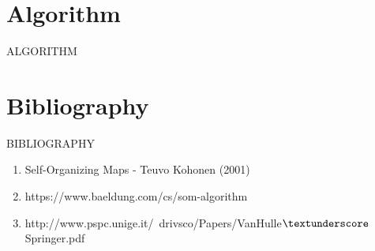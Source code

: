 \documentclass{beamer}
\begin{document}
\section{Algorithm}

	\begin{frame}
	
		\begin{center}
			
			\Huge ALGORITHM
		\end{center}
	\end{frame}










\section{Bibliography}
	
	\begin{frame}
	
		\begin{center}

			\Huge BIBLIOGRAPHY
		\end{center}
	\end{frame}


	\begin{frame}
	
		\begin{enumerate}
			
			\item Self-Organizing Maps - Teuvo Kohonen (2001)
			\item https://www.baeldung.com/cs/som-algorithm
			\item http://www.pspc.unige.it/~drivsco/Papers/VanHulle$\textunderscore$Springer.pdf
		\end{enumerate}
	\end{frame}
\end{document}
